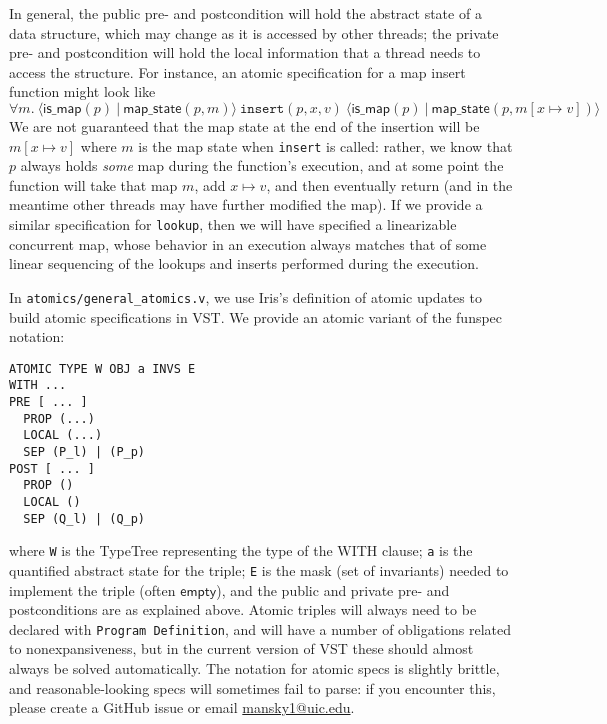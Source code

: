 \documentclass[11pt]{article}
\begin{document}
In general, the public pre- and postcondition will hold the abstract state of a data structure, which may change as it is accessed by other threads; the private pre- and postcondition will hold the local information that a thread needs to access the structure. For instance, an atomic specification for a map insert function might look like $$\forall m.\ \langle \mathsf{is\_map}(p)\ |\ \mathsf{map\_state}(p, m)\rangle\ \texttt{insert}(p, x, v)\ \langle \mathsf{is\_map}(p)\ |\ \mathsf{map\_state}(p, m[x \mapsto v])\rangle$$
We are not guaranteed that the map state at the end of the insertion will be $m[x \mapsto v]$ where $m$ is the map state when \texttt{insert} is called: rather, we know that $p$ always holds \emph{some} map during the function's execution, and at some point the function will take that map $m$, add $x \mapsto v$, and then eventually return (and in the meantime other threads may have further modified the map). If we provide a similar specification for \texttt{lookup}, then we will have specified a linearizable concurrent map, whose behavior in an execution always matches that of some linear sequencing of the lookups and inserts performed during the execution.

In \texttt{atomics/general\_atomics.v}, we use Iris's definition of atomic updates to build atomic specifications in VST. We provide an atomic variant of the funspec notation:

\begin{verbatim}
ATOMIC TYPE W OBJ a INVS E
WITH ...
PRE [ ... ]
  PROP (...)
  LOCAL (...)
  SEP (P_l) | (P_p)
POST [ ... ]
  PROP ()
  LOCAL ()
  SEP (Q_l) | (Q_p)
\end{verbatim}
where \texttt{W} is the \textsf{TypeTree} representing the type of the WITH clause; \texttt{a} is the quantified abstract state for the triple; \texttt{E} is the mask (set of invariants) needed to implement the triple (often $\mathsf{empty}$), and the public and private pre- and postconditions are as explained above. Atomic triples will always need to be declared with \texttt{Program Definition}, and will have a number of obligations related to nonexpansiveness, but in the current version of VST these should almost always be solved automatically. The notation for atomic specs is slightly brittle, and reasonable-looking specs will sometimes fail to parse: if you encounter this, please create a GitHub issue or email \url{mansky1@uic.edu}.
\end{document}
